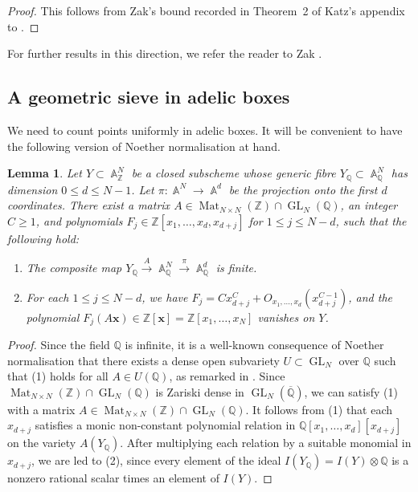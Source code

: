 \documentclass[a4paper,11pt, twoside,reqno]{amsart}
\theoremstyle{plain}
\newtheorem{lemma}[thm]{Lemma}
\theoremstyle{definition}
\theoremstyle{remark}
\newcommand{\bfx}{\bm{x}}
\newcommand{\ZZ}{\mathbb{Z}}
\newcommand{\QQ}{\mathbb{Q}}
\DeclareMathOperator{\GL}{GL}
\DeclareMathOperator{\A}{\mathbb{A}}
\DeclareMathOperator{\Mat}{Mat}
\renewcommand{\le}{\leqslant}
\renewcommand{\ge}{\geqslant}
\newcommand{\Qbar}{\overline{\mathbb{Q}}}
\numberwithin{equation}{section}
\begin{document}
\begin{proof}
This follows from Zak's bound
recorded in Theorem~2 of Katz's appendix to \cite{Hoo91}.
\end{proof}

For further results in this direction,
we refer the reader to Zak \cite[Theorem~1.7]{Zak93}.

\subsection{A geometric sieve in adelic boxes}

We need to count points uniformly in adelic boxes.
It will be convenient to have the following version of Noether normalisation at hand.

\begin{lemma}
\label{Le: NoetherNormalisation}
Let $Y\subset\A_\ZZ^N$ be a closed subscheme whose
generic fibre $Y_{\QQ}\subset\A_\QQ^N$
has dimension $0\le d\le N-1$.
Let $\pi\colon \A^N \to \A^d$ be the projection onto the first $d$ coordinates.
There exist
a matrix $A \in \Mat_{N\times N}(\ZZ) \cap \GL_N(\QQ)$,
an integer $C\ge 1$,
and polynomials $F_j\in \ZZ[x_1,\dots,x_d,x_{d+j}]$ for $1\le j\le N-d$,
such that the following hold:
\begin{enumerate}
\item The composite map
$Y_{\QQ} \xrightarrow{A} \A_\QQ^N \xrightarrow{\pi} \A_\QQ^d$
is finite.

\item For each $1\le j\le N-d$,
we have $F_j = Cx_{d+j}^C + O_{x_1,\dots,x_d}(x_{d+j}^{C-1})$,
and the polynomial $F_j(A\bfx)\in \ZZ[\bfx]=\ZZ[x_1,\dots,x_N]$
vanishes on $Y$.
\end{enumerate}
\end{lemma}

\begin{proof}
Since the field $\QQ$ is infinite,
it is a well-known consequence of
Noether normalisation
that there exists a dense open subvariety $U \subset \GL_N$ over $\QQ$
such that (1) holds for all $A\in U(\QQ)$,
as remarked in \cite[p.~284]{Eis95}.
Since $\Mat_{N\times N}(\ZZ) \cap \GL_N(\QQ)$ is Zariski dense in $\GL_N(\Qbar)$,
we can satisfy (1) with a matrix $A\in \Mat_{N\times N}(\ZZ) \cap \GL_N(\QQ)$.
It follows from (1) that each $x_{d+j}$ satisfies a monic non-constant polynomial relation in $\QQ[x_1,\dots,x_d][x_{d+j}]$ on the variety $A(Y_{\QQ})$.
After multiplying each relation by a suitable monomial in $x_{d+j}$, 
we are led to (2),
since every element of the ideal $I(Y_{\QQ}) = I(Y) \otimes \QQ$
is a nonzero rational scalar times an element of $I(Y)$.
\end{proof}
\end{document}
